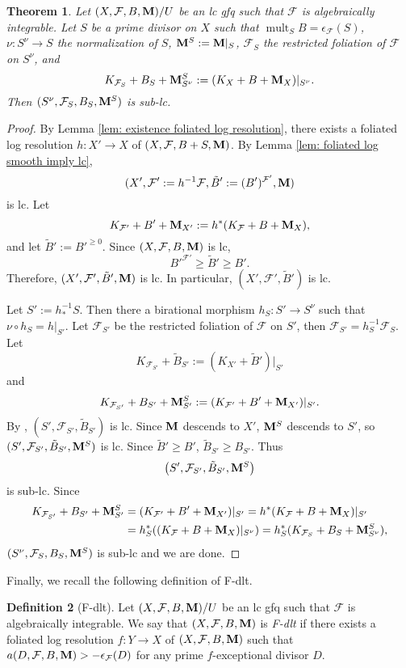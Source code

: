 \documentclass[11pt]{amsart}
\numberwithin{equation}{section}
\newcommand{\Mm}{{\bf{M}}}
\newcommand{\mult}{\operatorname{mult}}
\newcommand{\Ff}{\mathcal{F}}
\newtheorem{thm}{Theorem}[subsection]
\theoremstyle{definition}
\newtheorem{defn}[thm]{Definition}
\theoremstyle{definition}
\theoremstyle{definition}
\begin{document}
\begin{thm}\label{thm: not precise adjunction}
    Let $(X,\Ff,B,\Mm)/U$ be an lc gfq such that $\Ff$ is algebraically integrable. Let $S$ be a prime divisor on $X$ such that $\mult_SB=\epsilon_{\Ff}(S)$, $\nu: S^\nu\rightarrow S$ the normalization of $S$, $\Mm^S:=\Mm|_S$, $\Ff_S$ the restricted foliation of $\Ff$ on $S^\nu$, and
    $$K_{\Ff_S}+B_S+\Mm^S_{S^\nu}:=(K_X+B+\Mm_X)|_{S^\nu}.$$
    Then $(S^\nu,\Ff_S,B_S,\Mm^S)$ is sub-lc.
\end{thm}
\begin{proof}
By Lemma \ref{lem: existence foliated log resolution}, there exists a foliated log resolution $h: X'\rightarrow X$ of $(X,\Ff,B+S,\Mm)$. By Lemma \ref{lem: foliated log smooth imply lc}, 
$$(X',\Ff':=h^{-1}\Ff,\tilde B':=(B')^{\Ff'},\Mm)$$ is lc. Let
$$K_{\Ff'}+{B}'+\Mm_{X'}:=h^*(K_\Ff+B+\Mm_X),$$
and let $\tilde B':=B'^{\geq 0}$.
Since $(X,\Ff,B,\Mm)$ is lc, 
$$B'^{\Ff'}\geq \tilde B'\geq B'.$$
Therefore, $(X',\Ff',\tilde B',\Mm)$ is lc. In particular, $(X',\Ff',\tilde B')$ is lc.

Let $S':=h^{-1}_*S$. Then there a birational morphism $h_S: S'\rightarrow S^\nu$ such that $\nu\circ h_S=h|_{S'}$. Let $\Ff_{S'}$ be the restricted foliation of $\Ff$ on $S'$, then $\Ff_{S'}=h_S^{-1}\Ff_S$. Let
$$K_{\Ff_{S'}}+\tilde B_{S'}:=(K_{X'}+\tilde B')|_{S'}$$
and
$$K_{\Ff_{S'}}+B_{S'}+\Mm^S_{S'}:=(K_{\Ff'}+B'+\Mm_{X'})|_{S'}.$$
By \cite[Proposition 3.2]{ACSS21}, $(S',\Ff_{S'},\tilde B_{S'})$ is lc. Since $\Mm$ descends to $X'$, $\Mm^S$ descends to $S'$, so $(S',\Ff_{S'},\tilde B_{S'},\Mm^S)$ is lc.
Since $\tilde B'\geq B'$, $\tilde B_{S'}\geq B_{S'}$. Thus
$$\left(S',\Ff_{S'},\tilde B_{S'},\Mm^S\right)$$ 
is sub-lc. Since
\begin{align*}
K_{\Ff_{S'}}+B_{S'}+\Mm^S_{S'}&=(K_{\Ff'}+B'+\Mm_{X'})|_{S'}=h^*(K_{\Ff}+B+\Mm_X)|_{S'}\\
&=h_S^*((K_{\Ff}+B+\Mm_X)|_{S^\nu})=h_S^*(K_{\Ff_S}+B_S+\Mm^S_{S^\nu}),
\end{align*}
$(S^\nu,\Ff_S,B_S,\Mm^S)$ is sub-lc and we are done.
\end{proof}

Finally, we recall the following definition of F-dlt.

\begin{defn}[F-dlt]\label{defn: fdlt}
    Let $(X,\Ff,B,\Mm)/U$ be an lc gfq such that $\Ff$ is algebraically integrable. We say that $(X,\Ff,B,\Mm)$ is \emph{F-dlt} if there exists a foliated log resolution $f: Y\rightarrow X$ of  $(X,\Ff,B,\Mm)$ such that $a(D,\Ff,B,\Mm)>-\epsilon_{\Ff}(D)$ for any prime $f$-exceptional divisor $D$.
\end{defn}
\end{document}
